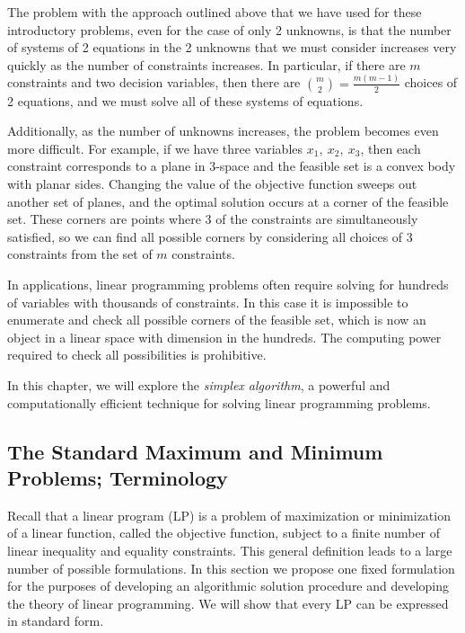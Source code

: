 \documentclass[letterpaper,10pt]{article}
\begin{document}
The problem with the approach outlined above that we have used for these introductory problems, even for the case of only 2 unknowns, is that the number of systems of 2 equations in the 2 unknowns that we must consider increases very quickly as the number of constraints increases. In particular, if there are $m$ constraints and two decision variables, then there are ${m\choose 2}=
\frac{m(m - 1)}{2}$ choices of 2 equations, and we must solve all of these systems of equations.

Additionally, as the number of unknowns increases, the problem becomes even more difficult.  For example, if we have three variables $x_1,~x_2,~x_3$, then each constraint corresponds to a plane in 3-space and the feasible set is a convex body with planar sides. Changing the value of the objective function sweeps out another set of planes, and the optimal solution occurs at a corner of the feasible set.  These corners are points where 3 of the constraints are simultaneously satisfied, so we can find all possible corners by considering all choices of 3 constraints from the set of $m$ constraints. 

In applications, linear programming problems often require solving for hundreds of variables with thousands of constraints.  In this case it is impossible to enumerate and check all possible corners of the feasible set, which is now an object in a linear space with dimension in the hundreds.  The computing power required to check all possibilities is prohibitive.

In this chapter, we will explore the {\em simplex algorithm}, a powerful and computationally efficient technique for solving linear programming problems.



\subsection{The Standard Maximum and Minimum Problems; Terminology}



Recall that a linear program (LP) is a problem of maximization or minimization of a linear function, called the objective function, subject to a finite number of linear inequality and equality constraints. This general definition leads to a large number of possible formulations. In this section we propose one fixed formulation for the purposes of developing an algorithmic solution procedure and developing the theory of linear programming. We will show that every LP can be expressed in standard form. 
\end{document}
